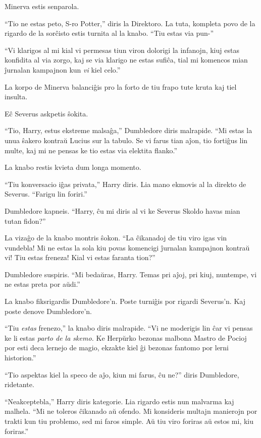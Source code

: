 Minerva estis senparola.

``Tio ne estas peto, S-ro Potter,'' diris la Direktoro. La tuta,
kompleta povo de la rigardo de la sorĉisto estis turnita al la
knabo. ``Tiu estas via pun-''

``Vi klarigos al mi kial vi permesas tiun viron dolorigi la infanojn,
kiuj estas konfidita al via zorgo, kaj se via klarigo ne estas sufiĉa,
tial mi komencos mian ĵurnalan kampajnon kun \emph{vi} kiel celo.''

La korpo de Minerva balanciĝis pro la forto de tiu frapo tute kruta
kaj tiel insulta.

Eĉ Severus askpetis ŝokita.

``Tio, Harry, estus ekstreme malsaĝa,'' Dumbledore diris
malrapide. ``Mi estas la unua ŝakero kontraŭ Lucius sur la tabulo. Se
vi farus tian aĵon, tio fortiĝus lin multe, kaj mi ne pensas ke tio
estas via elektita flanko.''

La knabo restis kvieta dum longa momento.

``Tiu konversacio iĝas privata,'' Harry diris. Lia mano ekmovis al la
direkto de Severus. ``Farigu lin foriri.''

Dumbledore kapneis. ``Harry, ĉu mi diris al vi ke Severus Skoldo havas
mian tutan fidon?''

La vizaĝo de la knabo montris ŝokon. ``La ĉikanadoj de tiu viro igas
vin vundebla! Mi ne estas la sola kiu povas komencigi ĵurnalan
kampajnon kontraŭ vi! Tiu estas freneza! Kial vi estas faranta tion?''

Dumbledore suspiris. ``Mi bedaŭras, Harry. Temas pri aĵoj, pri kiuj,
nuntempe, vi ne estas preta por aŭdi.''

La knabo fiksrigardis Dumbledore'n. Poste turniĝis por rigardi
Severus'n. Kaj poste denove Dumbledore'n.

``Tiu \emph{estas} frenezo,'' la knabo diris malrapide. ``Vi ne
moderigis lin ĉar vi pensas ke li estas \emph{parto de la skemo.} Ke
Herpŭrko bezonas malbona Mastro de Pocioj por esti deca lernejo de
magio, ekzakte kiel ĝi bezonas fantomo por lerni historion.''

``Tio aspektas kiel la speco de aĵo, kiun mi farus, ĉu ne?'' diris Dumbledore, ridetante.

``Neakceptebla,'' Harry diris kategorie. Lia rigardo estis nun
malvarma kaj malhela. ``Mi ne toleros ĉikanado aŭ ofendo. Mi
konsideris multajn manierojn por trakti kun tiu problemo, sed mi faros
simple. Aŭ tiu viro foriras aŭ estos mi, kiu foriras.''

